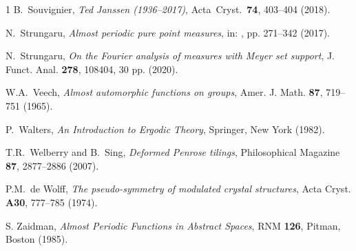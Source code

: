 \documentclass[11pt, a4wide]{amsart}
\numberwithin{lemma}{section}
\begin{document}
\begin{thebibliography}{1}
{B.~Souvignier, \textit{Ted Janssen (1936--2017)},
Acta~Cryst.~\textbf{74}, 403--404 (2018).}


{N.~Strungaru,
\textit{Almost periodic pure point measures}, in: \cite{BG3}, pp. 271--342 (2017).}

{N.~Strungaru, \textit{On the Fourier analysis of measures with Meyer set support}, J. Funct. Anal. \textbf{278}, 108404, 30 pp. (2020).}


{W.A.~Veech, \textit{Almost automorphic functions on groups},  Amer. J. Math. \textbf{87}, 719--751 (1965).}

{P.~Walters,
\textit{An Introduction to Ergodic Theory}, Springer, New York (1982).}

{T.R.~Welberry and B.~Sing,
\textit{Deformed Penrose tilings},
Philosophical Magazine \textbf{87}, 2877--2886  (2007).}

{P.M.~de Wolff, \textit{The pseudo-symmetry of modulated crystal structures},
Acta Cryst. \textbf{A30}, 777--785  (1974).}

{S. Zaidman, \textit{Almost Periodic Functions
in Abstract Spaces}, RNM \textbf{126}, Pitman, Boston (1985).}

\end{thebibliography}
\end{document}
